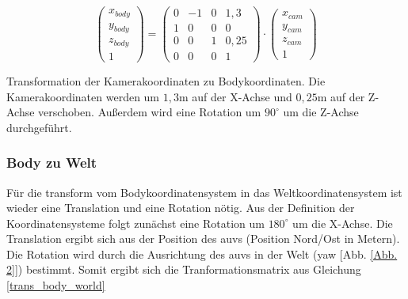 \begin{ownequation}[H]
\begin{equation}
\begin{pmatrix}
x_{body}\\y_{body}\\z_{body}\\1
\end{pmatrix}
=
\begin{pmatrix}
0 & -1 & 0& 1,3\\
1 & 0 & 0& 0\\
0 & 0 & 1& 0,25\\
0 & 0 & 0 & 1
\end{pmatrix}
\cdot
\begin{pmatrix}
x_{cam}\\y_{cam}\\z_{cam}\\1
\end{pmatrix}
\end{equation}
\caption[\gls{transform} der Kamerakoordinaten zu Bodykoordinaten]{Transformation der Kamerakoordinaten zu Bodykoordinaten. Die Kamerakoordinaten werden um $1,3$m auf der X-Achse und $0,25$m auf der Z-Achse verschoben. Außerdem wird eine Rotation um $90^\circ$ um die Z-Achse durchgeführt.}
\label{trans_cam_body}
\end{ownequation}

\subsubsection{Body zu Welt}
Für die \gls{transform} vom Bodykoordinatensystem in das Weltkoordinatensystem ist wieder eine Translation und eine Rotation nötig.
Aus der Definition der Koordinatensysteme folgt zunächst eine Rotation um $180^\circ$ um die X-Achse.
Die Translation ergibt sich aus der Position des \gls{auv}s (Position Nord/Ost in Metern).\\
Die Rotation wird durch die Ausrichtung des \gls{auv}s in der Welt (\gls{yaw} [Abb. \ref{Abb. 2}]) bestimmt. Somit ergibt sich die Tranformationsmatrix aus Gleichung \ref{trans_body_world}\\

